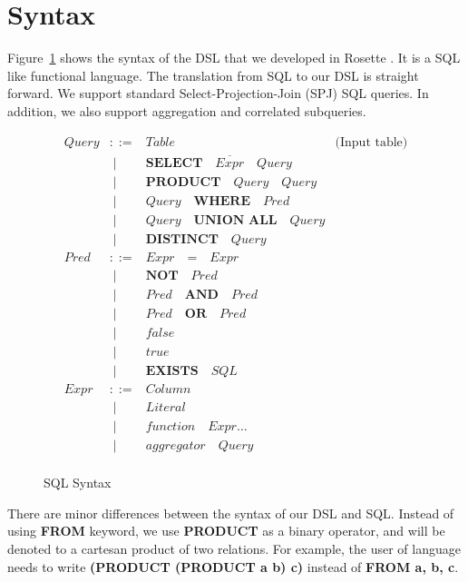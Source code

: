 \section{Syntax}

Figure~\ref{tab:sql-syntax} shows the syntax of the DSL that we developed
in Rosette \cite{rosette}. It is a SQL like functional language. The 
translation from SQL to our DSL is straight forward. We support standard
Select-Projection-Join (SPJ) SQL queries. In addition, we also support 
aggregation and correlated subqueries. 

\begin{figure}[t]
\centering
\[
\begin{array}{llll}
  Query & ::=  &  \mathit{Table} & \text{(Input table)} \\
        & \; \mid & \textbf{SELECT} \quad \overline{Expr} \quad  Query      \\ 
        & \; \mid  & \textbf{PRODUCT} \quad Query \quad Query        \\
        & \; \mid & Query \quad \textbf{WHERE} \quad Pred        \\
        & \; \mid & Query \quad \textbf{UNION ALL} \quad Query   \\
        & \; \mid & \textbf{DISTINCT} \quad Query                \\
  Pred & ::= & Expr \quad \textbf{=} \quad Expr \\
       & \; \mid &  \textbf{NOT} \quad Pred      \\
       & \; \mid & Pred \quad \textbf{AND} \quad Pred      \\ 
       & \; \mid & Pred \quad \textbf{OR} \quad Pred \\
       & \; \mid & false \\
       & \; \mid & true  \\
       & \; \mid & \textbf{EXISTS} \quad SQL \\
  Expr & ::= & Column                     \\
        & \; \mid & Literal                  \\
        & \; \mid & function \quad Expr \ldots     \\
        & \; \mid & aggregator \quad Query   \\  
\end{array}
\]
\caption{SQL Syntax}
\label{tab:sql-syntax}
\end{figure}

There are minor differences between the syntax of our DSL and SQL. Instead of using \textbf{FROM} keyword, we use \textbf{PRODUCT} as 
a binary operator, and will be denoted to a cartesan product of 
two relations. For example, the user of language needs to write 
\textbf{(PRODUCT (PRODUCT a b) c)} instead of \textbf{FROM a, b, c}.  


